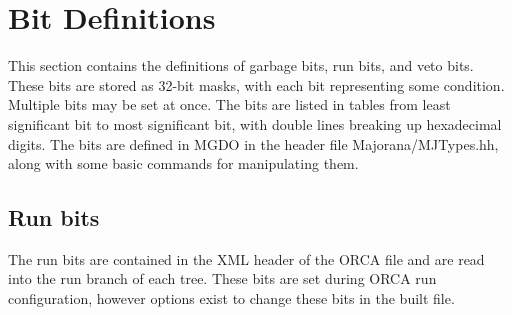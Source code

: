 \documentclass[/main.tex]{subfiles}
\begin{document}
\section{Bit Definitions}
This section contains the definitions of garbage bits, run bits, and veto bits.
These bits are stored as 32-bit masks, with each bit representing some condition.
Multiple bits may be set at once.
The bits are listed in tables from least significant bit to most significant bit, with double lines breaking up hexadecimal digits.
The bits are defined in MGDO in the header file Majorana/MJTypes.hh, along with some basic commands for manipulating them.

\subsection{Run bits} \label{sec:run_bits}
The run bits are contained in the XML header of the ORCA file and are read into the run branch of each tree.
These bits are set during ORCA run configuration, however options exist to change these bits in the built file.
\par
\end{document}
